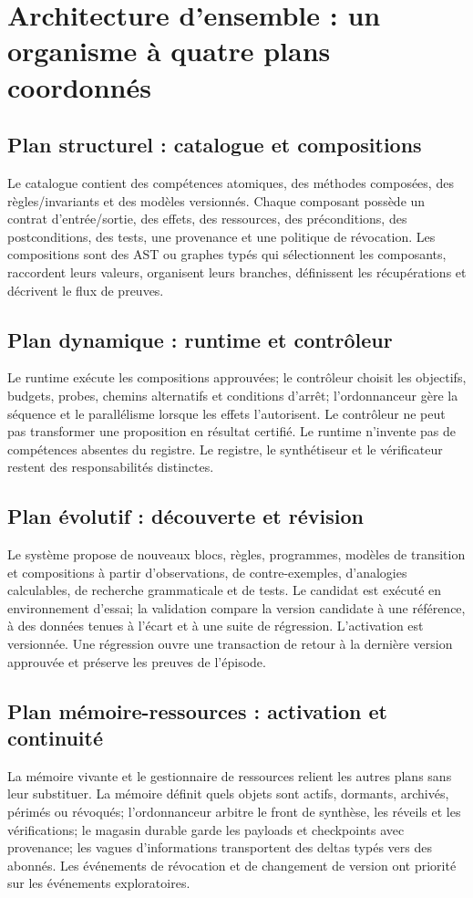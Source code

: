 \documentclass[11pt,a4paper]{article}
\begin{document}
\section{Architecture d'ensemble : un organisme à quatre plans coordonnés}
\subsection{Plan structurel : catalogue et compositions}
Le catalogue contient des compétences atomiques, des méthodes composées, des règles/invariants et des modèles versionnés. Chaque composant possède un contrat d'entrée/sortie, des effets, des ressources, des préconditions, des postconditions, des tests, une provenance et une politique de révocation. Les compositions sont des AST ou graphes typés qui sélectionnent les composants, raccordent leurs valeurs, organisent leurs branches, définissent les récupérations et décrivent le flux de preuves.

\subsection{Plan dynamique : runtime et contrôleur}
Le runtime exécute les compositions approuvées; le contrôleur choisit les objectifs, budgets, probes, chemins alternatifs et conditions d'arrêt; l'ordonnanceur gère la séquence et le parallélisme lorsque les effets l'autorisent. Le contrôleur ne peut pas transformer une proposition en résultat certifié. Le runtime n'invente pas de compétences absentes du registre. Le registre, le synthétiseur et le vérificateur restent des responsabilités distinctes.

\subsection{Plan évolutif : découverte et révision}
Le système propose de nouveaux blocs, règles, programmes, modèles de transition et compositions à partir d'observations, de contre-exemples, d'analogies calculables, de recherche grammaticale et de tests. Le candidat est exécuté en environnement d'essai; la validation compare la version candidate à une référence, à des données tenues à l'écart et à une suite de régression. L'activation est versionnée. Une régression ouvre une transaction de retour à la dernière version approuvée et préserve les preuves de l'épisode.

\subsection{Plan mémoire-ressources : activation et continuité}
La mémoire vivante et le gestionnaire de ressources relient les autres plans sans leur substituer. La mémoire définit quels objets sont actifs, dormants, archivés, périmés ou révoqués; l'ordonnanceur arbitre le front de synthèse, les réveils et les vérifications; le magasin durable garde les payloads et checkpoints avec provenance; les vagues d'informations transportent des deltas typés vers des abonnés. Les événements de révocation et de changement de version ont priorité sur les événements exploratoires.
\end{document}
